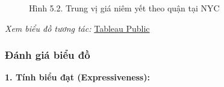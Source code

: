 \begin{figure}[H]
    \centering
    \caption{Hình 5.2. Trung vị giá niêm yết theo quận tại NYC}
    \label{fig:domain-task5-chart2}
\end{figure}

\noindent\small\textit{Xem biểu đồ tương tác: }\href{https://public.tableau.com/app/profile/duy.le4605/viz/Group10_17788537028430/Task5_2-MedianPricebyBorough?publish=yes}{Tableau Public}\normalsize

\subsubsection{Đánh giá biểu đồ}

\textbf{1. Tính biểu đạt (Expressiveness):}

